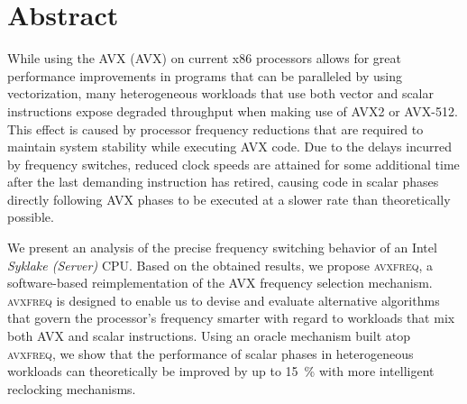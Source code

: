 \chapter{Abstract}
\label{sec:abstract}

While using the \acrlong{AVX} (\acrshort{AVX}) on current \gls{x86} processors allows for great performance improvements in programs that can be paralleled by using vectorization, many heterogeneous workloads that use both vector and scalar instructions expose degraded throughput when making use of \gls{AVX2} or \gls{AVX-512}. This effect is caused by processor frequency reductions that are required to maintain system stability while executing \acrshort{AVX} code. Due to the delays incurred by frequency switches, reduced clock speeds are attained for some additional time after the last demanding instruction has retired, causing code in scalar phases directly following  \acrshort{AVX} phases to be executed at a slower rate than theoretically possible.

We present an analysis of the precise frequency switching behavior of an Intel \textit{Syklake (Server)} \gls{CPU}. Based on the obtained results, we propose \textsc{avxfreq}, a software-based reimplementation of the \acrshort{AVX} frequency selection mechanism. \textsc{avxfreq} is designed to enable us to devise and evaluate alternative algorithms that govern the processor's frequency smarter with regard to workloads that mix both \acrshort{AVX} and scalar instructions. Using an oracle mechanism built atop \textsc{avxfreq}, we show that the performance of scalar phases in heterogeneous workloads can theoretically be improved by up to \SI{15}{\percent} with more intelligent reclocking mechanisms.